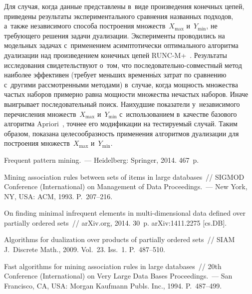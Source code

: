 \begin{multicols}{2}
Для случая, когда данные пред\-став\-ле\-ны в~виде произведения конечных цепей, 
приведены результаты экспериментального срав\-не\-ния названных подходов, а~так\-же независимого 
способа \mbox{по\-стро\-ения} множеств~$X_{\max}$ и~$Y_{\min}$, не тре\-бу\-юще\-го решения задачи дуализации. 
Эксперименты проводились на модельных задачах с~применением асимптотически оптимального
 алгоритма дуализации над произведением конечных цепей \mbox{RUNC-M}+~\cite{7}. 
 Результаты исследования свидетельствуют о~том, что по\-сле\-до\-ва\-тель\-но-со\-вмест\-ный 
 метод наиболее эффективен (требует меньших временн$\acute{\mbox{ы}}$х затрат по сравнению с~другими рас\-смот\-рен\-ны\-ми 
 методами) в~случае, когда мощ\-ность множества час\-тых наборов примерно равна мощ\-ности множества
  нечастых наборов. Иначе выигрывает последовательный поиск. Наихудшие показатели 
  у~независимого пе\-ре\-чис\-ле\-ния множеств~$X_{\max}$ и~$Y_{\min}$ с~использованием в~качестве
   базового алгоритма Apriori~\cite{2}, точ\-нее его модификации на тес\-ти\-ру\-емый случай. 
   Таким образом, показана це\-ле\-со\-об\-раз\-ность применения алгоритмов дуализации для 
   по\-стро\-ения множеств~$X_{\max}$ и~$Y_{\min}$.

  
  {\small\frenchspacing
 {%
 \begin{thebibliography}{9}  
    Frequent pattern mining.~--- Heidelberg: Springer, 2014. 467~p.
    
     Mining association rules 
    between sets of items in large databases~// \mbox{SIGMOD} Conference (International) on Management of Data
    Proceedings.~--- New York, NY, USA: ACM, 1993. P.~207--216.
    
     On finding minimal infrequent elements in multi-dimensional 
    data defined over partially ordered sets~// arXiv.org, 2014. 30~p. arXiv:1411.2275 [cs.DB].
    
     Algorithms for dualization over products of partially 
    ordered sets~// SIAM J.~Discrete Math., 2009. Vol.~23. Iss.~1. P.~487--510.
    
    Fast algorithms for mining association rules in large databases~// 
    20th Conference (International) on Very Large Data Bases Proceedings.~--- San Francisco, CA, USA: 
    Morgan Kaufmann Publs. Inc., 1994. P.~487--499.
    

\end{thebibliography}}}
\end{multicols}
